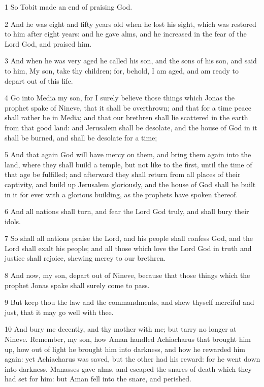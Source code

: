 \par 1 So Tobit made an end of praising God.
\par 2 And he was eight and fifty years old when he lost his sight, which was restored to him after eight years: and he gave alms, and he increased in the fear of the Lord God, and praised him.
\par 3 And when he was very aged he called his son, and the sons of his son, and said to him, My son, take thy children; for, behold, I am aged, and am ready to depart out of this life.
\par 4 Go into Media my son, for I surely believe those things which Jonas the prophet spake of Nineve, that it shall be overthrown; and that for a time peace shall rather be in Media; and that our brethren shall lie scattered in the earth from that good land: and Jerusalem shall be desolate, and the house of God in it shall be burned, and shall be desolate for a time;
\par 5 And that again God will have mercy on them, and bring them again into the land, where they shall build a temple, but not like to the first, until the time of that age be fulfilled; and afterward they shall return from all places of their captivity, and build up Jerusalem gloriously, and the house of God shall be built in it for ever with a glorious building, as the prophets have spoken thereof.
\par 6 And all nations shall turn, and fear the Lord God truly, and shall bury their idols.
\par 7 So shall all nations praise the Lord, and his people shall confess God, and the Lord shall exalt his people; and all those which love the Lord God in truth and justice shall rejoice, shewing mercy to our brethren.
\par 8 And now, my son, depart out of Nineve, because that those things which the prophet Jonas spake shall surely come to pass.
\par 9 But keep thou the law and the commandments, and shew thyself merciful and just, that it may go well with thee.
\par 10 And bury me decently, and thy mother with me; but tarry no longer at Nineve. Remember, my son, how Aman handled Achiacharus that brought him up, how out of light he brought him into darkness, and how he rewarded him again: yet Achiacharus was saved, but the other had his reward: for he went down into darkness. Manasses gave alms, and escaped the snares of death which they had set for him: but Aman fell into the snare, and perished.
